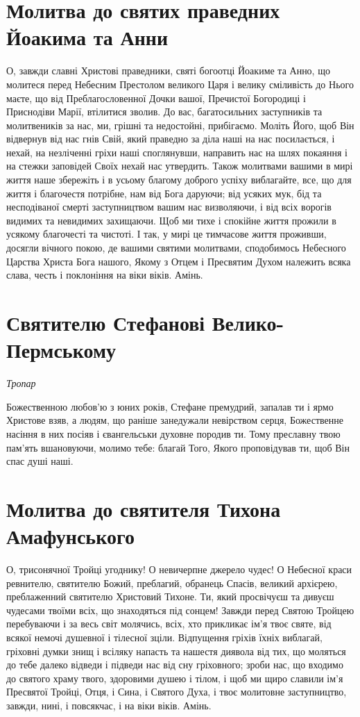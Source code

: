 \documentclass[chapters.tex]{subfiles}
\begin{document}
\section{Молитва до святих праведних Йоакима та Анни}
О, завжди славні Христові праведники, святі богоотці Йоакиме та Анно, що молитеся перед Небесним Престолом великого Царя і велику сміливість до Нього маєте, що від Преблагословенної Дочки вашої, Пречистої Богородиці і Приснодіви Марії, втілитися зволив. До вас, багатосильних заступників та молитвеників за нас, ми, грішні та недостойні, прибігаємо. Моліть Його, щоб Він відвернув від нас гнів Свій, який праведно за діла наші на нас посилається, і нехай, на незліченні гріхи наші споглянувши, направить нас на шлях покаяння і на стежки заповідей Своїх нехай нас утвердить. Також молитвами вашими в мирі життя наше збережіть і в усьому благому доброго успіху виблагайте, все, що для життя і благочестя потрібне, нам від Бога даруючи; від усяких мук, бід та несподіваної смерті заступництвом вашим нас визволяючи, і від всіх ворогів видимих та невидимих захищаючи. Щоб ми тихе і спокійне життя прожили в усякому благочесті та чистоті. І так, у мирі це тимчасове життя проживши, досягли вічного покою, де вашими святими молитвами, сподобимось Небесного Царства Христа Бога нашого, Якому з Отцем і Пресвятим Духом належить всяка слава, честь і поклоніння на віки віків. Амінь.

\section{Святителю Стефанові Велико-Пермському}
\emph{Тропар}

Божественною любов’ю з юних років, Стефане премудрий, запалав ти і ярмо Христове взяв, а людям, що раніше занедужали невірством серця, Божественне насіння в них посіяв і євангельськи духовне породив ти. Тому преславну твою пам’ять вшановуючи, молимо тебе: благай Того, Якого проповідував ти, щоб Він спас душі наші.

\section{Молитва до святителя Тихона Амафунського}
О, трисонячної Тройці угоднику! О невичерпне джерело чудес! О Небесної краси ревнителю, святителю Божий, преблагий, обранець Спасів, великий архієрею, преблаженний святителю Христовий Тихоне. Ти, який просвічуєш та дивуєш чудесами твоїми всіх, що знаходяться під сонцем! Завжди перед Святою Тройцею перебуваючи і за весь світ молячись, всіх, хто прикликає ім’я твоє святе, від всякої немочі душевної і тілесної зціли. Відпущення гріхів їхніх виблагай, гріховні думки знищ і всіляку напасть та нашестя диявола від тих, що моляться до тебе далеко відведи і підведи нас від сну гріховного; зроби нас, що входимо до святого храму твого, здоровими душею і тілом, і щоб ми щиро славили ім’я Пресвятої Тройці, Отця, і Сина, і Святого Духа, і твоє молитовне заступництво, завжди, нині, і повсякчас, і на віки віків. Амінь.
\end{document}
